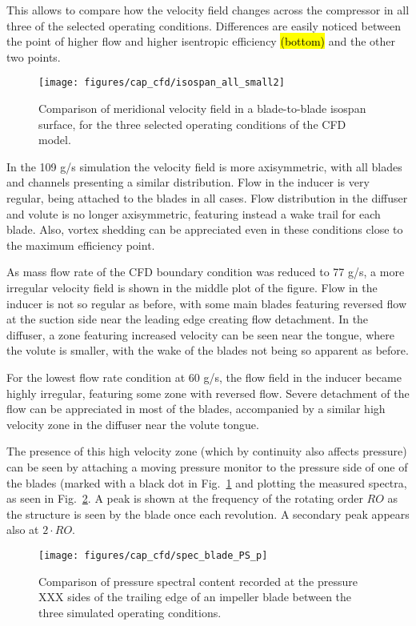 This allows to compare how the velocity field changes across the compressor in all three of the selected operating conditions. Differences are easily noticed between the point of higher flow and higher isentropic efficiency \hl{(bottom)} and the other two points. 

\begin{figure}[htb!]
\centering
\texttt{[image: figures/cap\_cfd/isospan\_all\_small2]}
\caption{Comparison of meridional velocity field in a blade-to-blade isospan surface, for the three selected operating conditions of the CFD model.}
\label{fig:cfd_isospan_all}
\end{figure}

In the 109 g/s simulation the velocity field is more axisymmetric, with all blades and channels presenting a similar distribution. Flow in the inducer is very regular, being attached to the blades in all cases. Flow distribution in the diffuser and volute is no longer axisymmetric, featuring instead a wake trail for each blade. Also, vortex shedding can be appreciated even in these conditions close to the maximum efficiency point.

As mass flow rate of the CFD boundary condition was reduced to 77 g/s, a more irregular velocity field is shown in the middle plot of the figure. Flow in the inducer is not so regular as before, with some main blades featuring reversed flow at the suction side near the leading edge creating flow detachment. In the diffuser, a zone featuring increased velocity can be seen near the tongue, where the volute is smaller, with the wake of the blades not being so apparent as before.

For the lowest flow rate condition at 60 g/s, the flow field in the inducer became highly irregular, featuring some zone with reversed flow. Severe detachment of the flow can be appreciated in most of the blades, accompanied by a similar high velocity zone in the diffuser near the volute tongue. 

The presence of this high velocity zone (which by continuity also affects pressure) can be seen by attaching a moving pressure monitor to the pressure side of one of the blades (marked with a black dot in Fig.~\ref{fig:cfd_isospan_all} and plotting the measured spectra, as seen in Fig.~\ref{fig:cfd_spec_blade_p}. A peak is shown at the frequency of the rotating order $RO$ as the structure is seen by the blade once each revolution. A secondary peak appears also at $2\cdot RO$. 

\begin{figure}[htb!]
\centering
\texttt{[image: figures/cap\_cfd/spec\_blade\_PS\_p]}\\[5mm]
\caption{Comparison of pressure spectral content recorded at the pressure XXX sides of the trailing edge of an impeller blade between the three simulated operating conditions.}
\label{fig:cfd_spec_blade_p}
\end{figure}

